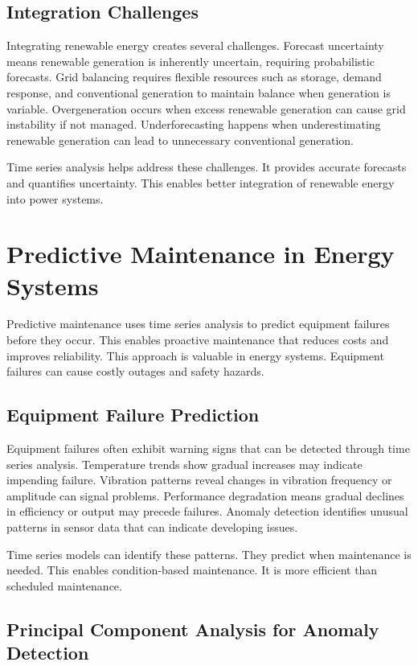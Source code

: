 \subsection{Integration Challenges}

Integrating renewable energy creates several challenges. Forecast uncertainty means renewable generation is inherently uncertain, requiring probabilistic forecasts. Grid balancing requires flexible resources such as storage, demand response, and conventional generation to maintain balance when generation is variable. Overgeneration occurs when excess renewable generation can cause grid instability if not managed. Underforecasting happens when underestimating renewable generation can lead to unnecessary conventional generation.

Time series analysis helps address these challenges. It provides accurate forecasts and quantifies uncertainty. This enables better integration of renewable energy into power systems.

\section{Predictive Maintenance in Energy Systems}

Predictive maintenance uses time series analysis to predict equipment failures before they occur. This enables proactive maintenance that reduces costs and improves reliability. This approach is valuable in energy systems. Equipment failures can cause costly outages and safety hazards.

\subsection{Equipment Failure Prediction}

Equipment failures often exhibit warning signs that can be detected through time series analysis. Temperature trends show gradual increases may indicate impending failure. Vibration patterns reveal changes in vibration frequency or amplitude can signal problems. Performance degradation means gradual declines in efficiency or output may precede failures. Anomaly detection identifies unusual patterns in sensor data that can indicate developing issues.

Time series models can identify these patterns. They predict when maintenance is needed. This enables condition-based maintenance. It is more efficient than scheduled maintenance.

\subsection{Principal Component Analysis for Anomaly Detection}


